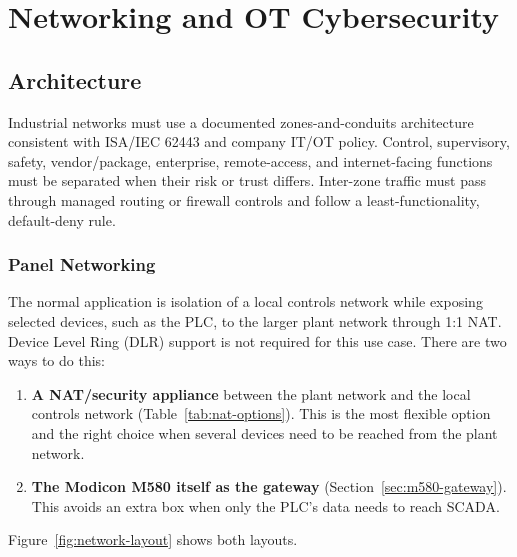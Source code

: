 \chapter{Networking and OT Cybersecurity}
\section{Architecture}
Industrial networks must use a documented zones-and-conduits architecture consistent with ISA/IEC 62443 and company IT/OT policy. Control, supervisory, safety, vendor/package, enterprise, remote-access, and internet-facing functions must be separated when their risk or trust differs. Inter-zone traffic must pass through managed routing or firewall controls and follow a least-functionality, default-deny rule.

\subsection{Panel Networking}\label{sec:panel-networking}
The normal application is isolation of a local controls network while exposing selected devices, such as the PLC, to the larger plant network through 1:1 NAT. Device Level Ring (DLR) support is not required for this use case. There are two ways to do this:
\begin{enumerate}[itemsep=2pt]
  \item \textbf{A NAT/security appliance} between the plant network and the local controls network (Table~\ref{tab:nat-options}). This is the most flexible option and the right choice when several devices need to be reached from the plant network.
  \item \textbf{The Modicon M580 itself as the gateway} (Section~\ref{sec:m580-gateway}). This avoids an extra box when only the PLC's data needs to reach SCADA.
\end{enumerate}
Figure~\ref{fig:network-layout} shows both layouts.

